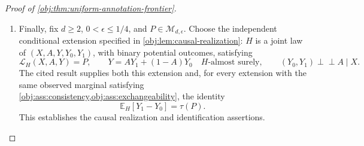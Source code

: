 \begin{proof}[Proof of \cref{obj:thm:uniform-annotation-frontier}]
\begin{enumerate}
\item Finally, fix \(d\ge2\), \(0<\epsilon\le1/4\), and \(P\in\mathcal M_{d,\epsilon}\). Choose the independent conditional extension specified in \cref{obj:lem:causal-realization}: \(H\) is a joint law of \((X,A,Y,Y_0,Y_1)\), with binary potential outcomes, satisfying
\[
\mathcal L_H(X,A,Y)=P,\qquad
Y=AY_1+(1-A)Y_0\quad H\text{-almost surely},
\qquad
(Y_0,Y_1)\perp\!\!\!\perp A\mid X.
\]
The cited result supplies both this extension and, for every extension with the same observed marginal satisfying \cref{obj:ass:consistency,obj:ass:exchangeability}, the identity
\[
\mathbb E_H[Y_1-Y_0]=\tau(P).
\]
This establishes the causal realization and identification assertions.
\end{enumerate}
\end{proof}

